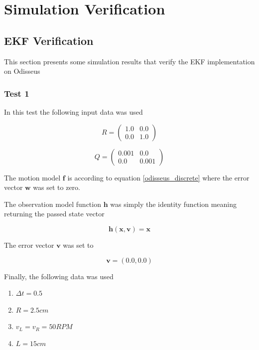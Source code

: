 \section{Simulation Verification}


\subsection{EKF Verification}
This section presents some simulation results that verify the EKF implementation on Odisseus

\subsubsection{Test 1}

In this test the following input data was used

\begin{equation}
R = 
\begin{pmatrix}
 1.0 & 0.0 \\
0.0 & 1.0 
\end{pmatrix}
\end{equation}

\begin{equation}
Q = 
\begin{pmatrix}
0.001 & 0.0 \\
0.0 & 0.001 
\end{pmatrix}
\end{equation}

The motion model $\mathbf{f}$ is according to equation \ref{odisseus_discrete} where the error vector $\mathbf{w}$ was set to zero.

The observation model function $\mathbf{h}$ was simply the identity function meaning returning the passed state vector

\begin{equation}
\mathbf{h}(\mathbf{x}, \mathbf{v}) = \mathbf{x}
\end{equation}

The error vector $\mathbf{v}$ was set to

\begin{equation}
\mathbf{v} = (0.0, 0.0)
\end{equation}

Finally, the following data was used

\begin{enumerate}
	\item $\Delta t = 0.5$
	\item $R = 2.5 cm$
	\item $v_L = v_R = 50 RPM$
	\item $L= 15 cm$ 
\end{enumerate}


